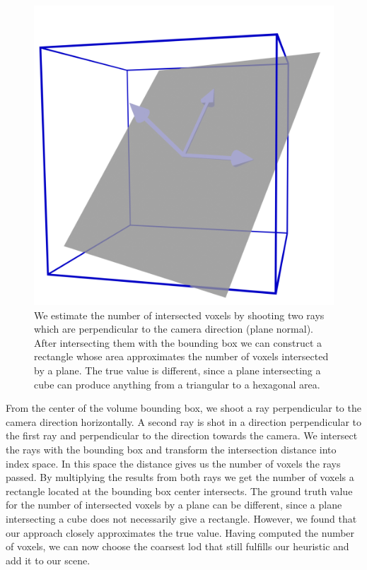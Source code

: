 \begin{figure}[t]
    \centering
    \includegraphics[width=0.3\linewidth]{img/voxel_estimation.png} %
    \caption[Estimation of intersected voxels]{We estimate the number of intersected voxels by shooting two rays which are perpendicular to the camera direction (plane normal). After intersecting them with the bounding box we can construct a rectangle whose area approximates the number of voxels intersected by a plane. The true value is different, since a plane intersecting a cube can produce anything from a triangular to a hexagonal area.}
    \label{fig:voxel_estimation}
\end{figure}
From the center of the volume bounding box, we shoot a ray perpendicular to the camera direction horizontally.
A second ray is shot in a direction perpendicular to the first ray and perpendicular to the direction towards the camera.
We intersect the rays with the bounding box and transform the intersection distance into index space.
In this space the distance gives us the number of voxels the rays passed.
By multiplying the results from both rays we get the number of voxels a rectangle located at the bounding box center intersects.
The ground truth value for the number of intersected voxels by a plane can be different, since a plane intersecting a cube does not necessarily give a rectangle.
However, we found that our approach closely approximates the true value.
Having computed the number of voxels, we can now choose the coarsest \ac{lod} that still fulfills our heuristic and add it to our scene.

